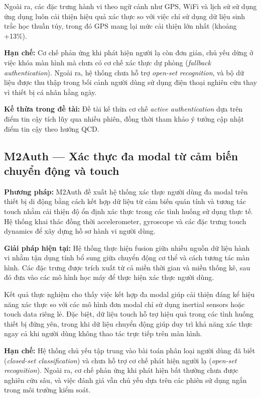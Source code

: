 \documentclass[../DoAn.tex]{subfiles}
\begin{document}
    Ngoài ra, các đặc trưng hành vi theo ngữ cảnh như GPS, WiFi và lịch sử sử dụng ứng dụng luôn cải thiện hiệu quả xác thực so với việc chỉ sử dụng dữ liệu sinh trắc học thuần túy, trong đó GPS mang lại mức cải thiện lớn nhất (khoảng +13\%).
    
    \textbf{Hạn chế:} Cơ chế phản ứng khi phát hiện người lạ còn đơn giản, chủ yếu dừng ở việc khóa màn hình mà chưa có cơ chế xác thực dự phòng (\textit{fallback authentication}). Ngoài ra, hệ thống chưa hỗ trợ \textit{open-set recognition}, và bộ dữ liệu được thu thập trong bối cảnh người dùng sử dụng điện thoại nghiên cứu thay vì thiết bị cá nhân hằng ngày.
    
    \textbf{Kế thừa trong đề tài:} Đề tài kế thừa cơ chế \textit{active authentication} dựa trên điểm tin cậy tích lũy qua nhiều phiên, đồng thời tham khảo ý tưởng cập nhật điểm tin cậy theo hướng QCD.

    \subsection{M2Auth --- Xác thực đa modal từ cảm biến chuyển động và touch}

    \textbf{Phương pháp:} M2Auth đề xuất hệ thống xác thực người dùng đa modal trên thiết bị di động bằng cách kết hợp dữ liệu từ cảm biến quán tính và tương tác touch nhằm cải thiện độ ổn định xác thực trong các tình huống sử dụng thực tế. Hệ thống khai thác đồng thời accelerometer, gyroscope và các đặc trưng touch dynamics để xây dựng hồ sơ hành vi người dùng.
    
    \textbf{Giải pháp hiện tại:} Hệ thống thực hiện fusion giữa nhiều nguồn dữ liệu hành vi nhằm tận dụng tính bổ sung giữa chuyển động cơ thể và cách tương tác màn hình. Các đặc trưng được trích xuất từ cả miền thời gian và miền thống kê, sau đó đưa vào các mô hình học máy để thực hiện xác thực người dùng.
    
    Kết quả thực nghiệm cho thấy việc kết hợp đa modal giúp cải thiện đáng kể hiệu năng xác thực so với các mô hình đơn modal chỉ sử dụng inertial sensors hoặc touch data riêng lẻ. Đặc biệt, dữ liệu touch hỗ trợ hiệu quả trong các tình huống thiết bị đứng yên, trong khi dữ liệu chuyển động giúp duy trì khả năng xác thực ngay cả khi người dùng không thao tác trực tiếp trên màn hình.
    
    \textbf{Hạn chế:} Hệ thống chủ yếu tập trung vào bài toán phân loại người dùng đã biết (\textit{closed-set classification}) và chưa hỗ trợ cơ chế phát hiện người lạ (\textit{open-set recognition}). Ngoài ra, cơ chế phản ứng khi phát hiện bất thường chưa được nghiên cứu sâu, và việc đánh giá vẫn chủ yếu dựa trên các phiên sử dụng ngắn trong môi trường kiểm soát.
    
\end{document}
